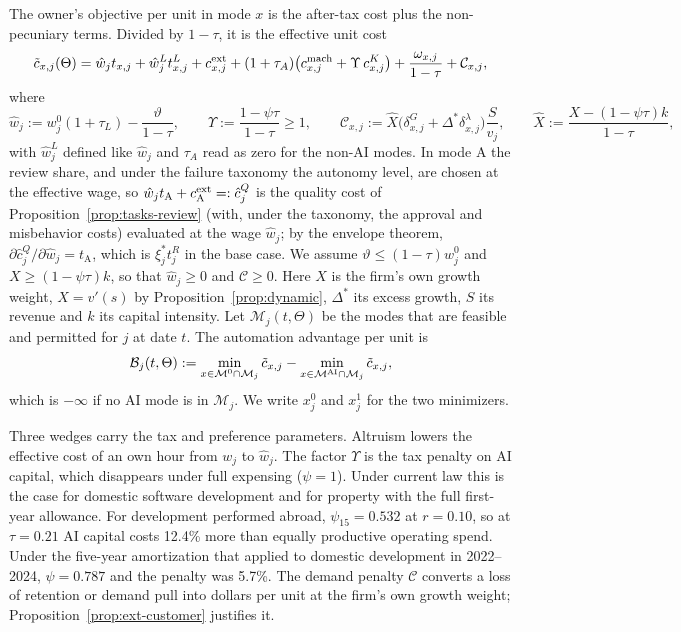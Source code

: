 \begin{definition}\label{def:ext-effcost}
The owner's objective per unit in mode $x$ is the after-tax cost plus the non-pecuniary terms. Divided by $1-\tau$, it is the effective unit cost
\begin{equation}\label{eq:ext-effcost}
\tilde c_{x,j}(\Theta)=\hat w_jt_{x,j}+\hat w^L_jt^L_{x,j}+c^{\rm ext}_{x,j}+(1+\tau_A)\bigl(c^{\rm mach}_{x,j}+\Upsilon\,c^K_{x,j}\bigr)+\frac{\omega_{x,j}}{1-\tau}+\mathcal C_{x,j},
\end{equation}
where
\begin{equation}\label{eq:ext-wedges}
\hat w_j:=w^0_j(1+\tau_L)-\frac{\vartheta}{1-\tau},\qquad \Upsilon:=\frac{1-\psi\tau}{1-\tau}\ge1,\qquad \mathcal C_{x,j}:=\hat X\bigl(\delta^G_{x,j}+\Delta^*\delta^\lambda_{x,j}\bigr)\frac{S}{v_j},\qquad \hat X:=\frac{X-(1-\psi\tau)k}{1-\tau},
\end{equation}
with $\hat w^L_j$ defined like $\hat w_j$ and $\tau_A$ read as zero for the non-AI modes. In mode A the review share, and under the failure taxonomy the autonomy level, are chosen at the effective wage, so $\hat w_jt_{\mathrm A}+c^{\rm ext}_{\mathrm A}=:\hat c^Q_j$ is the quality cost of Proposition~\ref{prop:tasks-review} (with, under the taxonomy, the approval and misbehavior costs) evaluated at the wage $\hat w_j$; by the envelope theorem, $\partial\hat c^Q_j/\partial\hat w_j=t_{\mathrm A}$, which is $\xi^*_jt^R_j$ in the base case. We assume $\vartheta\le(1-\tau)w^0_j$ and $X\ge(1-\psi\tau)k$, so that $\hat w_j\ge0$ and $\mathcal C\ge0$. Here $X$ is the firm's own growth weight, $X=v'(s)$ by Proposition~\ref{prop:dynamic}, $\Delta^*$ its excess growth, $S$ its revenue and $k$ its capital intensity. Let $\mathcal M_j(t,\Theta)$ be the modes that are feasible and permitted for $j$ at date $t$. The automation advantage per unit is
\begin{equation}\label{eq:ext-B}
\mathcal B_j(t,\Theta):=\min_{x\in\mathcal M^0\cap\mathcal M_j}\tilde c_{x,j}-\min_{x\in\mathcal M^{\rm AI}\cap\mathcal M_j}\tilde c_{x,j},
\end{equation}
which is $-\infty$ if no AI mode is in $\mathcal M_j$. We write $x^0_j$ and $x^1_j$ for the two minimizers.
\end{definition}

Three wedges carry the tax and preference parameters. Altruism lowers the effective cost of an own hour from $w_j$ to $\hat w_j$. The factor $\Upsilon$ is the tax penalty on AI capital, which disappears under full expensing ($\psi=1$). Under current law this is the case for domestic software development and for property with the full first-year allowance. For development performed abroad, $\psi_{15}=0.532$ at $r=0.10$, so at $\tau=0.21$ AI capital costs 12.4\% more than equally productive operating spend. Under the five-year amortization that applied to domestic development in 2022--2024, $\psi=0.787$ and the penalty was 5.7\%. The demand penalty $\mathcal C$ converts a loss of retention or demand pull into dollars per unit at the firm's own growth weight; Proposition~\ref{prop:ext-customer} justifies it.

